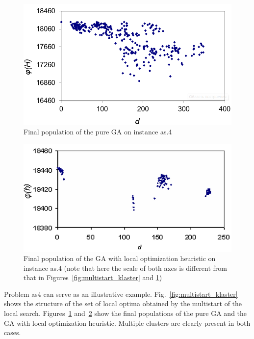 \documentclass{ifacconf}
\begin{document}
 \begin{figure}[h!]
	\includegraphics[scale=0.5]{ga_klaster}
  \caption{Final population of the pure GA on instance as.4} \label{fig:ga_klaster}
  \end{figure}
 \begin{figure}[h!]
\centering
 \includegraphics[scale=0.48]{gals_klaster}
  \caption{Final population of the GA with local optimization heuristic on instance as.4 \label{fig:gals_klaster} 
  (note that here the scale of both axes is different from 
  that in Figures~\ref{fig:multistart_klaster} and \ref{fig:ga_klaster})}
  \end{figure}

Problem as4 can serve as an illustrative example. Fig.~\ref{fig:multistart_klaster} shows the structure 
of the set of local optima obtained by the multistart  of the local search. 
Figures~\ref{fig:ga_klaster} and~\ref{fig:gals_klaster} show the final populations of the pure GA and the GA 
with local optimization heuristic. Multiple clusters are clearly present in both cases. 
\end{document}
